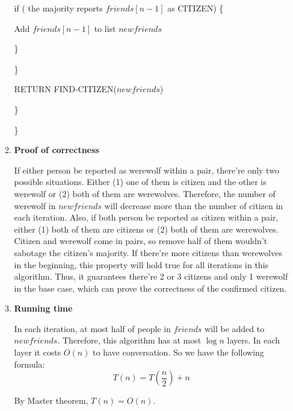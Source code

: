 \documentclass[11pt]{article}
\begin{document}
\begin{enumerate}
\begin{enumerate}
				\qquad\qquad\qquad if ( the majority reports $friends\left[n-1\right]$ as CITIZEN) \{
				
				\qquad\qquad\qquad\qquad Add $friends\left[n-1\right]$ to list $newfriends$
				
				\qquad\qquad\qquad \}
								
				\qquad\qquad \}
				
				\qquad\qquad RETURN FIND-CITIZEN($newfriends$)
				
			\qquad\}
			
		\}
		
		\item \textbf{Proof of correctness}
		
		If either person be reported as werewolf within a pair, there're only two possible situations. Either (1) one of them is citizen and the other is werewolf or (2) both of them are werewolves. Therefore, the number of werewolf in $newfriends$ will decrease more than the number of citizen in each iteration. Also, if both person be reported as citizen within a pair, either (1) both of them are citizens or (2) both of them are werewolves. Citizen and werewolf come in pairs, so remove half of them wouldn't sabotage the citizen's majority. If there're more citizens than werewolves in the beginning, this property will hold true for all iterations in this algorithm. Thus, it guarantees there're 2 or 3 citizens and only 1 werewolf in the base case, which can prove the correctness of the confirmed citizen.
		
		\item \textbf{Running time}
		
		In each iteration, at most half of people in  $friends$ will be added to $newfriends$. Therefore, this algorithm has at most $\log n$ layers. In each layer it costs $O(n)$ to  have conversation. So we have the following formula:
		\[
			T(n) = T(\frac{n}{2}) + n
		\]
		
		By Master theorem, $T(n) = O(n)$.
				
	\end{enumerate}



	
\end{enumerate}
\end{document}
